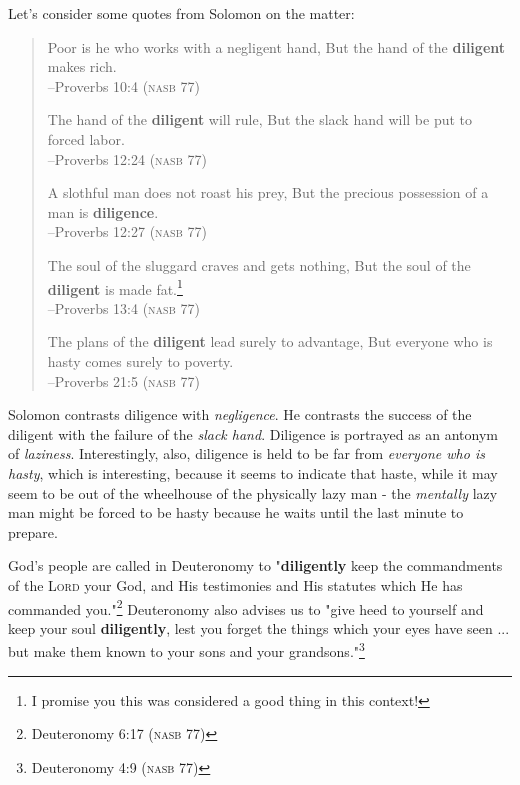 Let's consider some quotes from Solomon on the matter:
\begin{quote}
Poor is he who works with a negligent hand, But the hand of the \textbf{diligent} makes rich.
\\ \hspace*{\fill} --Proverbs 10:4 (\textsc{nasb 77})

The hand of the \textbf{diligent} will rule, But the slack hand will be put to forced labor.
\\ \hspace*{\fill} --Proverbs 12:24 (\textsc{nasb 77})

A slothful man does not roast his prey, But the precious possession of a man is \textbf{diligence}.
\\ \hspace*{\fill} --Proverbs 12:27 (\textsc{nasb 77})

The soul of the sluggard craves and gets nothing, But the soul of the \textbf{diligent} is made fat.\footnote{I promise you this was considered a good thing in this context!}
\\ \hspace*{\fill} --Proverbs 13:4 (\textsc{nasb 77})

The plans of the \textbf{diligent} lead surely to advantage, But everyone who is hasty comes surely to poverty.
\\ \hspace*{\fill} --Proverbs 21:5 (\textsc{nasb 77})
\end{quote}

Solomon contrasts diligence with \textit{negligence}.  He contrasts the success of the diligent with the failure of the \textit{slack hand}.  Diligence is portrayed as an antonym of \textit{laziness}.  Interestingly, also, diligence is held to be far from \textit{everyone who is hasty}, which is interesting, because it seems to indicate that haste, while it may seem to be out of the wheelhouse of the physically lazy man - the \textit{mentally} lazy man might be forced to be hasty because he waits until the last minute to prepare.

God's people are called in Deuteronomy to "\textbf{diligently} keep the commandments of the \textsc{Lord} your God, and His testimonies and His statutes which He has commanded you."\footnote{Deuteronomy 6:17 (\textsc{nasb 77})}  Deuteronomy also advises us to "give heed to yourself and keep your soul \textbf{diligently}, lest you forget the things which your eyes have seen ... but make them known to your sons and your grandsons."\footnote{Deuteronomy 4:9 (\textsc{nasb 77})}

